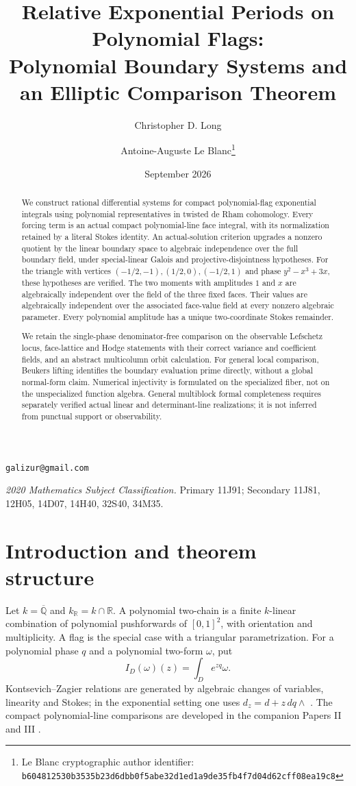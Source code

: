 \documentclass[11pt]{article}
\title{Relative Exponential Periods on Polynomial Flags:\\
Polynomial Boundary Systems and an Elliptic Comparison Theorem}
\author{Christopher D. Long \and Antoine-Auguste Le Blanc\thanks{Le Blanc cryptographic author identifier: \texttt{b6048125\allowbreak{}30b3535b\allowbreak{}23d6dbb0\allowbreak{}f5abe32d\allowbreak{}1ed1a9de\allowbreak{}35fb4f7d\allowbreak{}04d62cff\allowbreak{}08ea19c8}}}
\date{September 2026}
\numberwithin{equation}{section}
\theoremstyle{definition}
\theoremstyle{remark}
\begin{document}
\maketitle

\begin{center}
\small
\texttt{galizur@gmail.com}
\end{center}

\begin{abstract}
We construct rational differential systems for compact polynomial-flag
exponential integrals using polynomial representatives in twisted de Rham
cohomology. Every forcing term is an actual compact polynomial-line face
integral, with its normalization retained by a literal Stokes identity.
An actual-solution criterion upgrades a nonzero quotient by the linear
boundary space to algebraic independence over the full boundary field,
under special-linear Galois and projective-disjointness hypotheses.
For the triangle with vertices $(-1/2,-1),(1/2,0),(-1/2,1)$ and phase
$y^2-x^3+3x$, these hypotheses are verified. The two moments with amplitudes
$1$ and $x$ are algebraically independent over the field of the three
fixed faces. Their values are algebraically independent over the associated
face-value field at every nonzero algebraic parameter. Every polynomial
amplitude has a unique two-coordinate Stokes remainder.

We retain the single-phase denominator-free comparison on the observable
Lefschetz locus, face-lattice and Hodge statements with their correct
variance and coefficient fields, and an abstract multicolumn orbit
calculation. For general local comparison, Beukers lifting identifies the
boundary evaluation prime directly, without a global normal-form claim.
Numerical injectivity is formulated on the specialized fiber, not on the
unspecialized function algebra. General multiblock formal completeness
requires separately verified actual linear and determinant-line
realizations; it is not inferred from punctual support or observability.
\end{abstract}

\medskip
\noindent\textit{2020 Mathematics Subject Classification.}
Primary 11J91; Secondary 11J81, 12H05, 14D07, 14H40, 32S40, 34M35.

\tableofcontents

\section{Introduction and theorem structure}\label{sec:intro}
Let $k=\overline{\mathbb Q}$ and $k_{\mathbb R}=k\cap\mathbb R$.
A polynomial two-chain is a finite $k$-linear combination of polynomial
pushforwards of $[0,1]^2$, with orientation and multiplicity. A flag is the
special case with a triangular parametrization. For a polynomial phase $q$
and a polynomial two-form $\omega$, put
\[
 I_D(\omega)(z)=\int_D e^{zq}\omega.
\]
Kontsevich--Zagier relations are generated by algebraic changes of variables,
linearity and Stokes; in the exponential setting one uses
$d_z=d+z\,dq\wedge$ \cite{KontsevichZagier,CommelinHabeggerHuber}.
The compact polynomial-line comparisons are developed in the companion
Papers II and III \cite{LongLinearKZ,PaperIII}.
\end{document}
